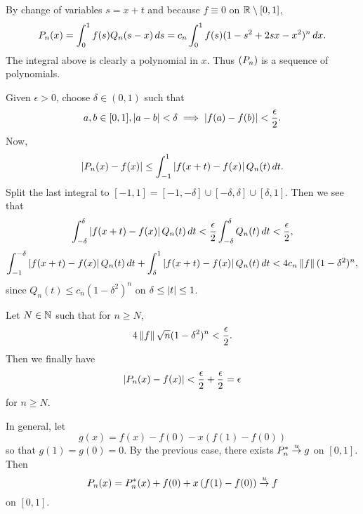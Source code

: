 By change of variables \(s = x + t\) and because \(f \equiv 0\) on \(\mathbb{R} \setminus [0, 1]\),
\[
    P_n(x) = \int_0^1 f(s) Q_n(s - x) \,d{s} = c_n \int_0^1 f(s)(1-s^2+2sx-x^2)^n \,d{x}.
\]
The integral above is clearly a polynomial in \(x\). Thus \(\left( P_n \right)\) is a sequence of polynomials.

Given \(\epsilon > 0\), choose \(\delta \in (0, 1)\) such that
\[
    a, b \in [0, 1], \left| a - b \right| < \delta \implies \left| f(a) - f(b) \right| < \frac{\epsilon}{2}.
\]
Now,
\[
    \left| P_n(x) - f(x) \right| \leq \int_{-1}^1 \left| f(x+t) - f(x) \right| Q_n(t)\,d{t}.
\]
Split the last integral to \([-1, 1] = [-1, -\delta] \cup [-\delta, \delta] \cup [\delta, 1]\). Then we see that
\[
    \int_{-\delta}^\delta \left| f(x+t) - f(x) \right| Q_n(t)\,d{t} < \frac{\epsilon}{2} \int_{-\delta}^\delta Q_n(t)\,d{t} < \frac{\epsilon}{2},
\]
\[
    \int_{-1}^{-\delta} \left| f(x+t) - f(x) \right| Q_n(t)\,d{t} + \int_{\delta}^1 \left| f(x+t) - f(x) \right| Q_n(t)\,d{t} < 4 c_n \left\lVert f \right\rVert (1-\delta^2)^n,
\]
since \(Q_n(t) \leq c_n(1-\delta^2)^n\) on \(\delta \leq \left| t \right| \leq 1\).

Let \(N \in \mathbb{N}\) such that for \(n \geq N\),
\[
    4 \left\lVert f \right\rVert \sqrt{n} (1-\delta^2)^n < \frac{\epsilon}{2}.
\]
Then we finally have
\[
    \left| P_n(x) - f(x) \right| < \frac{\epsilon}{2} + \frac{\epsilon}{2} = \epsilon
\]
for \(n \geq N\).

In general, let
\[
    g(x) = f(x) - f(0) - x\left(f(1) - f(0)\right)
\]
so that \(g(1) = g(0) = 0\). By the previous case, there exists \(P_n^\ast \overset{u}{\rightarrow} g\) on \([0, 1]\). Then
\[
    P_n(x) = P_n^\ast(x) + f(0) + x\left(f(1) - f(0)\right) \overset{u}{\rightarrow} f
\]
on \([0, 1]\).

\pagebreak
